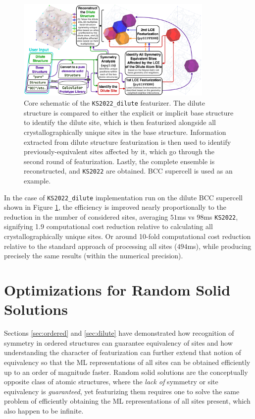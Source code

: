 \begin{figure}[h]
    \centering
    \includegraphics[width=0.85\textwidth]{KS2022_dilute.png}
    \caption{Core schematic of the \texttt{KS2022\_dilute} featurizer. The dilute structure is compared to either the explicit or implicit base structure to identify the dilute site, which is then featurized alongside all crystallographically unique sites in the base structure. Information extracted from dilute structure featurization is then used to identify previously-equivalent sites affected by it, which go through the second round of featurization. Lastly, the complete ensemble is reconstructed, and \texttt{KS2022} are obtained. BCC supercell is used as an example.}
    \label{fig:KS2022dilute}
\end{figure}

In the case of \texttt{KS2022\_dilute} implementation run on the dilute BCC supercell shown in Figure \ref{fig:KS2022dilute}, the efficiency is improved nearly proportionally to the reduction in the number of considered sites, averaging $51$ms vs $98$ms \texttt{KS2022}, signifying 1.9 computational cost reduction relative to calculating all crystallographically unique sites. Or around 10-fold computational cost reduction relative to the standard \cite{Ward2017, Chen2019GraphCrystals, Jha2019IRNet, Krajewski2022ExtensibleNetworks, Choudhary2021AtomisticPredictions, Deng2023CHGNetModelling, Davariashtiyani2023FormationRepresentation, Schmidt2023Machine-Learning-AssistedMaterials} approach of processing all sites ($494$ms), while producing precisely the same results (within the numerical precision).


\section{Optimizations for Random Solid Solutions} \label{sec:randomsolutions}

Sections \ref{sec:ordered} and \ref{sec:dilute} have demonstrated how recognition of symmetry in ordered structures can guarantee equivalency of sites and how understanding the character of featurization can further extend that notion of equivalency so that the ML representations of all sites can be obtained efficiently up to an order of magnitude faster. Random solid solutions are the conceptually opposite class of atomic structures, where the \emph{lack of} symmetry or site equivalency is \emph{guaranteed}, yet featurizing them requires one to solve the same problem of efficiently obtaining the ML representations of all sites present, which also happen to be infinite.


